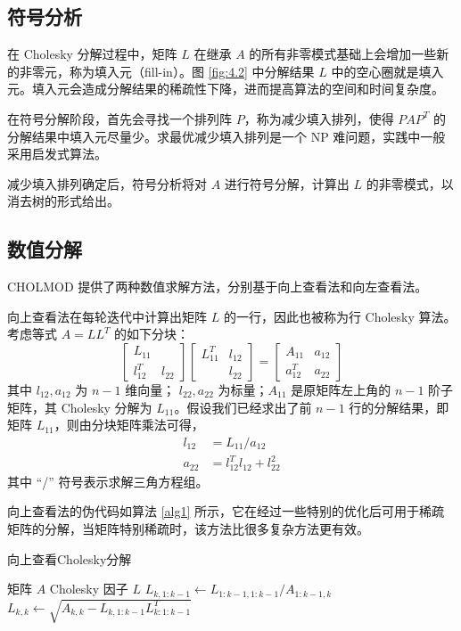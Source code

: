 \subsection{符号分析}

在 Cholesky 分解过程中，矩阵 $L$ 在继承 $A$ 的所有非零模式基础上会增加一些新的非零元，称为填入元（fill-in）。图 \ref{fig:4.2} 中分解结果 $L$ 中的空心圈就是填入元。填入元会造成分解结果的稀疏性下降，进而提高算法的空间和时间复杂度。

在符号分解阶段，首先会寻找一个排列阵 $P$，称为减少填入排列，使得 $PAP^T$ 的分解结果中填入元尽量少。求最优减少填入排列是一个 NP 难问题，实践中一般采用启发式算法。

减少填入排列确定后，符号分析将对 $A$ 进行符号分解，计算出 $L$ 的非零模式，以消去树的形式给出。

\subsection{数值分解}

CHOLMOD 提供了两种数值求解方法，分别基于向上查看法和向左查看法。

向上查看法在每轮迭代中计算出矩阵 $L$ 的一行，因此也被称为行 Cholesky 算法。考虑等式 $A=LL^T$ 的如下分块：
\begin{equation}
\begin{bmatrix}
L_{11} & \\
l_{12}^T & l_{22}
\end{bmatrix}
\begin{bmatrix}
L_{11}^T & l_{12}\\
 & l_{22}
\end{bmatrix}=
\begin{bmatrix}
A_{11} & a_{12}\\
a_{12}^T & a_{22}
\end{bmatrix}
\end{equation}
其中 $l_{12}, a_{12}$ 为 $n-1$ 维向量； $l_{22}, a_{22}$ 为标量；$A_{11}$ 是原矩阵左上角的 $n-1$ 阶子矩阵，其 Cholesky 分解为 $L_{11}$。假设我们已经求出了前 $n-1$ 行的分解结果，即矩阵 $L_{11}$，则由分块矩阵乘法可得，
\begin{align}
l_{12}&=L_{11}/ a_{12}\\
a_{22}&=l_{12}^T l_{12}+l_{22}^2
\end{align}其中 “/” 符号表示求解三角方程组。

向上查看法的伪代码如算法 \ref{alg1} 所示，它在经过一些特别的优化后可用于稀疏矩阵的分解，当矩阵特别稀疏时，该方法比很多复杂方法更有效。

\begin{algorithm}
  \caption{向上查看Cholesky分解}
  \label{alg1}
  \small
  \begin{algorithmic}
  \REQUIRE 矩阵 $A$
  \ENSURE Cholesky 因子 $L$
  \STATE $L_{k,1:k-1} \gets L_{1:k-1,1:k-1}/A_{1:k-1,k}$
  \STATE $L_{k,k} \gets \sqrt{A_{k,k} \minus L_{k,1:k-1} L_{k:1:k-1}^T} $  
  \ENDFOR
  \end{algorithmic}
\end{algorithm}

